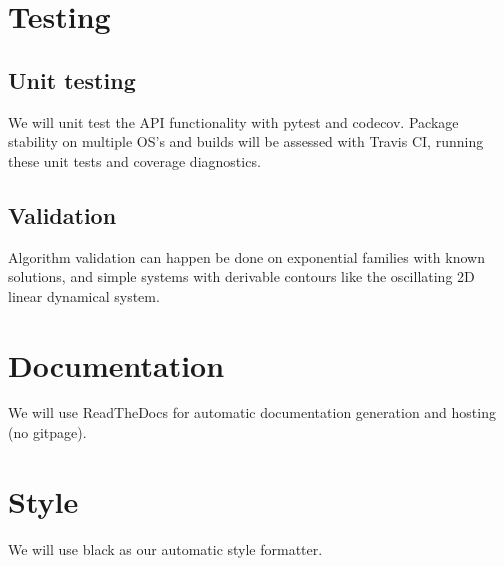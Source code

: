 \documentclass[11pt]{article}
\begin{document}
\section{Testing}
\subsection{Unit testing}
We will unit test the API functionality with pytest and codecov.  Package stability on multiple OS's and builds will be assessed with Travis CI, running these unit tests and coverage diagnostics.

\subsection{Validation}
Algorithm validation can happen be done on exponential families with known solutions, and simple systems with derivable contours like the oscillating 2D linear dynamical system.

\section{Documentation}
We will use ReadTheDocs for automatic documentation generation and hosting (no gitpage).

\section{Style}
We will use black as our automatic style formatter.



\end{document}
